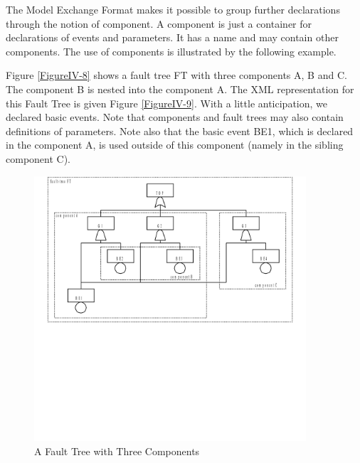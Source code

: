 \documentclass[11pt]{article}
\begin{document}
The Model Exchange Format makes it possible to group further
declarations through the notion of component. A component is just a
container for declarations of events and parameters. It has a name and
may contain other components. The use of components is illustrated by
the following example.

Figure \ref{FigureIV-8} shows a fault tree FT with three components A, B and C. The
component B is nested into the component A. The XML representation for
this Fault Tree is given Figure \ref{FigureIV-9}. With a little anticipation, we
declared basic events. Note that components and fault trees may also
contain definitions of parameters. Note also that the basic event BE1,
which is declared in the component A, is used outside of this component
(namely in the sibling component C).


\begin{figure}[htbp]

\includegraphics[width=0.9\textwidth]{./word/media/image6.png}
\caption{\label{fig:orga02dc11}
A Fault Tree with Three Components}
\end{figure}
\end{document}
